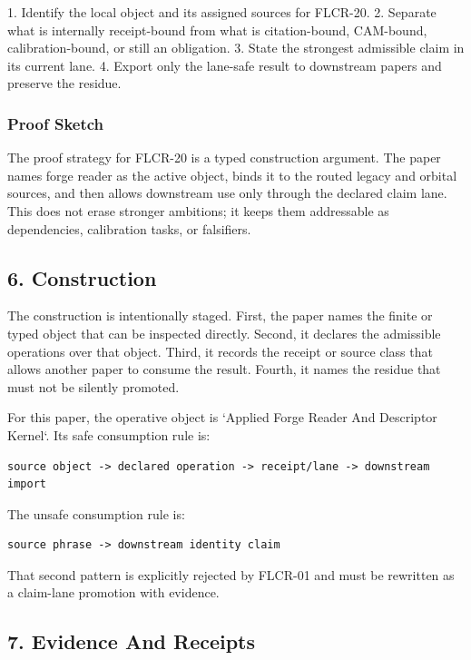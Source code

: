 \documentclass[11pt]{article}
\begin{document}
1. Identify the local object and its assigned sources for FLCR-20.
2. Separate what is internally receipt-bound from what is citation-bound, CAM-bound, calibration-bound, or still an obligation.
3. State the strongest admissible claim in its current lane.
4. Export only the lane-safe result to downstream papers and preserve the residue.

\subsubsection*{Proof Sketch}

The proof strategy for FLCR-20 is a typed construction argument. The paper names forge reader as the active object, binds it to the routed legacy and orbital sources, and then allows downstream use only through the declared claim lane. This does not erase stronger ambitions; it keeps them addressable as dependencies, calibration tasks, or falsifiers.

\subsection*{6. Construction}

The construction is intentionally staged. First, the paper names the finite or
typed object that can be inspected directly. Second, it declares the admissible
operations over that object. Third, it records the receipt or source class that
allows another paper to consume the result. Fourth, it names the residue that
must not be silently promoted.

For this paper, the operative object is `Applied Forge Reader And Descriptor Kernel`. Its safe consumption
rule is:

\begin{verbatim}
source object -> declared operation -> receipt/lane -> downstream import
\end{verbatim}

The unsafe consumption rule is:

\begin{verbatim}
source phrase -> downstream identity claim
\end{verbatim}

That second pattern is explicitly rejected by FLCR-01 and must be rewritten as
a claim-lane promotion with evidence.

\subsection*{7. Evidence And Receipts}
\end{document}
